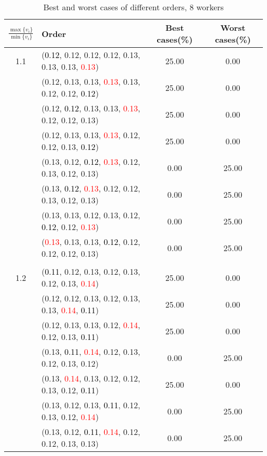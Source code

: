 \documentclass[10pt,a4paper]{report}
\begin{document}
\newpage\begin{center}
	\small
	\begin{longtable}{clcc}
		\caption{Best and worst cases of different orders, 8 workers}\\
		\toprule
		\setlength{\tabcolsep}{1mm}
		\renewcommand\baselinestretch{0.5}\selectfont
		$\frac{\max\{v_i\}}{\min\{v_i\}}$ & Order & Best cases(\%) & Worst cases(\%) \\
			\midrule		1.1			&(\textcolor{black}{0.12}, 0.12, 0.12, 0.12, 0.13, 0.13, 0.13, \textcolor{red}{0.13})&25.00&0.00\\
			&(0.12, 0.13, 0.13, \textcolor{red}{0.13}, 0.13, 0.12, 0.12, \textcolor{black}{0.12})&25.00&0.00\\
			&(0.12, \textcolor{black}{0.12}, 0.13, 0.13, \textcolor{red}{0.13}, 0.12, 0.12, 0.13)&25.00&0.00\\
			&(0.12, 0.13, 0.13, \textcolor{red}{0.13}, 0.12, 0.12, 0.13, \textcolor{black}{0.12})&25.00&0.00\\
			&(0.13, 0.12, \textcolor{black}{0.12}, \textcolor{red}{0.13}, 0.12, 0.13, 0.12, 0.13)&0.00&25.00\\
			&(0.13, \textcolor{black}{0.12}, \textcolor{red}{0.13}, 0.12, 0.12, 0.13, 0.12, 0.13)&0.00&25.00\\
			&(0.13, 0.13, 0.12, 0.13, 0.12, \textcolor{black}{0.12}, 0.12, \textcolor{red}{0.13})&0.00&25.00\\
			&(\textcolor{red}{0.13}, 0.13, 0.13, \textcolor{black}{0.12}, 0.12, 0.12, 0.12, 0.13)&0.00&25.00\\
		&&&\\
		1.2			&(\textcolor{black}{0.11}, 0.12, 0.13, 0.12, 0.13, 0.12, 0.13, \textcolor{red}{0.14})&25.00&0.00\\
			&(0.12, 0.12, 0.13, 0.12, 0.13, 0.13, \textcolor{red}{0.14}, \textcolor{black}{0.11})&25.00&0.00\\
			&(0.12, 0.13, 0.13, 0.12, \textcolor{red}{0.14}, 0.12, 0.13, \textcolor{black}{0.11})&25.00&0.00\\
			&(0.13, \textcolor{black}{0.11}, \textcolor{red}{0.14}, 0.12, 0.13, 0.12, 0.13, 0.12)&0.00&25.00\\
			&(0.13, \textcolor{red}{0.14}, 0.13, 0.12, 0.12, 0.13, 0.12, \textcolor{black}{0.11})&25.00&0.00\\
			&(0.13, 0.12, 0.13, \textcolor{black}{0.11}, 0.12, 0.13, 0.12, \textcolor{red}{0.14})&0.00&25.00\\
			&(0.13, 0.12, \textcolor{black}{0.11}, \textcolor{red}{0.14}, 0.12, 0.12, 0.13, 0.13)&0.00&25.00\\

\end{longtable}
\end{center}
\end{document}
